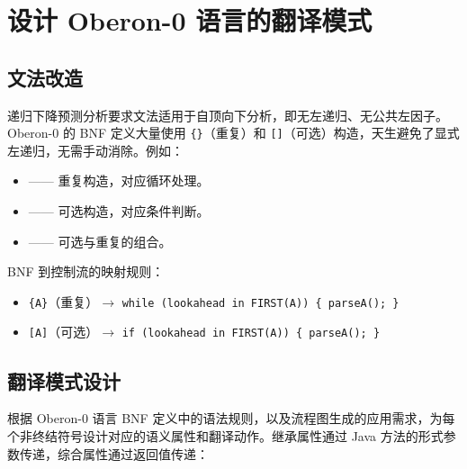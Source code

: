 \section{设计 Oberon-0 语言的翻译模式}

\subsection{文法改造}

递归下降预测分析要求文法适用于自顶向下分析，即无左递归、无公共左因子。Oberon-0 的 BNF 定义大量使用 \texttt{\{\}}（重复）和 \texttt{[]}（可选）构造，天生避免了显式左递归，无需手动消除。例如：

\begin{itemize}
    \item {} —— 重复构造，对应循环处理。
    \item {} —— 可选构造，对应条件判断。
    \item {} —— 可选与重复的组合。
\end{itemize}

BNF 到控制流的映射规则：
\begin{itemize}
    \item \texttt{\{A\}}（重复）$\to$ \texttt{while (lookahead in FIRST(A)) \{ parseA(); \}}
    \item \texttt{[A]}（可选）$\to$ \texttt{if (lookahead in FIRST(A)) \{ parseA(); \}}
\end{itemize}

\subsection{翻译模式设计}

根据 Oberon-0 语言 BNF 定义中的语法规则，以及流程图生成的应用需求，为每个非终结符号设计对应的语义属性和翻译动作。继承属性通过 Java 方法的形式参数传递，综合属性通过返回值传递：

